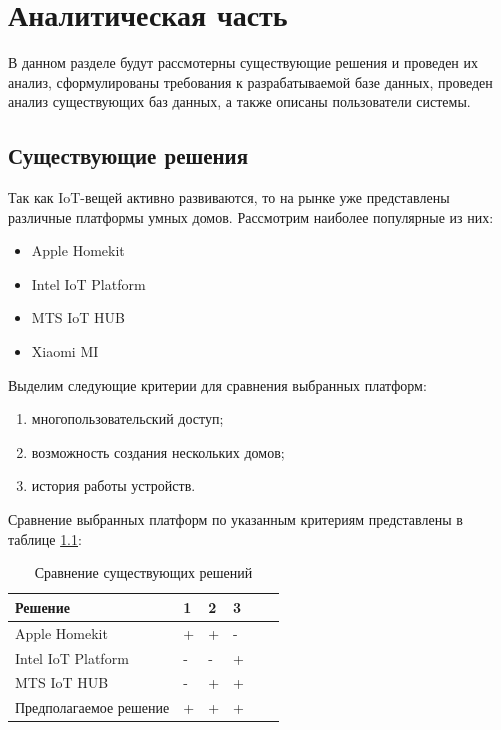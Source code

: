 \chapter{Аналитическая часть}

В данном разделе будут рассмотерны существующие решения и проведен их анализ, 
сформулированы требования к разрабатываемой 
базе данных, проведен анализ существующих баз данных, а также описаны
пользователи системы.

\section{Существующие решения}

Так как IoT-вещей активно развиваются, то на рынке уже представлены различные платформы умных домов. 
Рассмотрим наиболее популярные из них:
\begin{itemize}
    \item Apple Homekit~\cite{apple}
    \item Intel IoT Platform~\cite{intel}
    \item MTS IoT HUB~\cite{mts}
    \item Xiaomi MI~\cite{xmi}
\end{itemize}

Выделим следующие критерии для сравнения выбранных платформ:
\begin{enumerate}
    \item[1)] многопользовательский доступ;
    \item[2)] возможность создания нескольких домов;
    \item[3)] история работы устройств.
\end{enumerate}

Сравнение выбранных платформ по указанным критериям представлены в таблице \ref{tab:solutions}:
\begin{table}[!ht]
    \centering
    \caption{\label{tab:solutions} Сравнение существующих решений}
    \begin{tabular}{|l|l|l|l|l|l|}
    \hline
        Решение & 1 & 2 & 3  \\ \hline
        Apple Homekit & + & + & - \\ \hline
        Intel IoT Platform & - & - & + \\ \hline
        MTS IoT HUB & - & + & + \\ \hline
        Предполагаемое решение & + & + & + \\ \hline
    \end{tabular}
\end{table}

